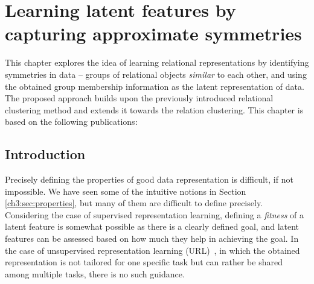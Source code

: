 \chapter{Learning latent features by capturing approximate symmetries}\label{ch:symmetries}

This chapter explores the idea of learning relational representations by identifying symmetries in data -- groups of relational objects \textit{similar} to each other, and using the obtained group membership information as the latent representation of data.
The proposed approach builds upon the previously introduced relational clustering method and extends it towards the relation clustering.
This chapter is based on the following publications:

\begin{quote}
\end{quote}

\begin{quote}
\end{quote}

\begin{quote}
\end{quote}




\section{Introduction}




Precisely defining the properties of good data representation is difficult, if not impossible.
We have seen some of the intuitive notions in Section \ref{ch3:sec:properties}, but many of them are difficult to define precisely.
Considering the case of supervised representation learning, defining a \textit{fitness} of a latent feature is somewhat possible as there is a clearly defined goal, and latent features can be assessed based on how much they help in achieving the goal.
In the case of unsupervised representation learning (URL)~\cite{Hinton504,Bengio07greedylayer-wise,RanzatoBL07}, in which the obtained representation is not tailored for one specific task but can rather be shared among multiple tasks, there is no such guidance.






